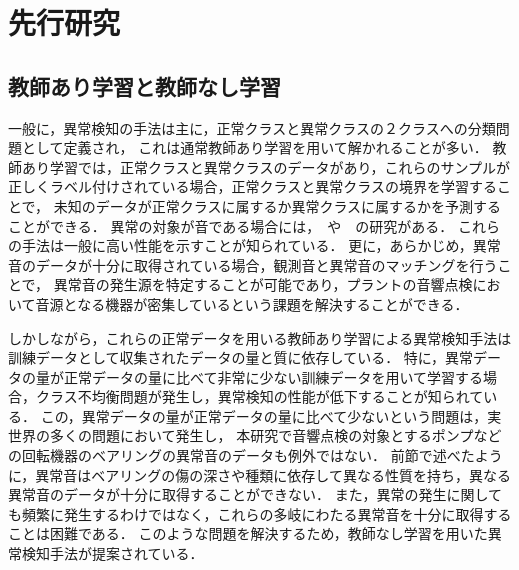 \documentclass[../main]{subfiles}
\begin{document}
\section{先行研究}
\label{sec:intro_previous-research}
\subsection{教師あり学習と教師なし学習}
一般に，異常検知の手法は主に，正常クラスと異常クラスの２クラスへの分類問題として定義され，
これは通常教師あり学習を用いて解かれることが多い．
教師あり学習では，正常クラスと異常クラスのデータがあり，これらのサンプルが正しくラベル付けされている場合，正常クラスと異常クラスの境界を学習することで，
未知のデータが正常クラスに属するか異常クラスに属するかを予測することができる．
異常の対象が音である場合には，　や　の研究がある．
これらの手法は一般に高い性能を示すことが知られている．
更に，あらかじめ，異常音のデータが十分に取得されている場合，観測音と異常音のマッチングを行うことで，
異常音の発生源を特定することが可能であり，プラントの音響点検において音源となる機器が密集しているという課題を解決することができる．

しかしながら，これらの正常データを用いる教師あり学習による異常検知手法は訓練データとして収集されたデータの量と質に依存している．
特に，異常データの量が正常データの量に比べて非常に少ない訓練データを用いて学習する場合，クラス不均衡問題が発生し，異常検知の性能が低下することが知られている．
この，異常データの量が正常データの量に比べて少ないという問題は，実世界の多くの問題において発生し，
本研究で音響点検の対象とするポンプなどの回転機器のベアリングの異常音のデータも例外ではない．
前節で述べたように，異常音はベアリングの傷の深さや種類に依存して異なる性質を持ち，異なる異常音のデータが十分に取得することができない．
また，異常の発生に関しても頻繁に発生するわけではなく，これらの多岐にわたる異常音を十分に取得することは困難である．
このような問題を解決するため，教師なし学習を用いた異常検知手法が提案されている．
\end{document}
